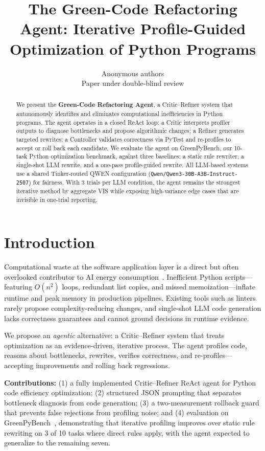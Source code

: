 \documentclass{article}
\title{\textbf{The Green-Code Refactoring Agent: Iterative Profile-Guided Optimization of Python Programs}}
\author{
Anonymous authors\\
Paper under double-blind review
}
\date{}
\begin{document}
\maketitle

\begin{abstract}
We present the \textbf{Green-Code Refactoring Agent}, a Critic--Refiner system that autonomously identifies and eliminates computational inefficiencies in Python programs. The agent operates in a closed ReAct loop: a Critic interprets profiler outputs to diagnose bottlenecks and propose algorithmic changes; a Refiner generates targeted rewrites; a Controller validates correctness via PyTest and re-profiles to accept or roll back each candidate. We evaluate the agent on GreenPyBench, our 10-task Python optimization benchmark, against three baselines: a static rule rewriter, a single-shot LLM rewrite, and a one-pass profile-guided rewrite. All LLM-based systems use a shared Tinker-routed QWEN configuration (\texttt{Qwen/Qwen3-30B-A3B-Instruct-2507}) for fairness. With 3 trials per LLM condition, the agent remains the strongest iterative method by aggregate VIS while exposing high-variance edge cases that are invisible in one-trial reporting.
\end{abstract}

\section{Introduction}

Computational waste at the software application layer is a direct but often overlooked contributor to AI energy consumption~\cite{strubell2019energy,schwartz2020green}. Inefficient Python scripts---featuring $O(n^2)$ loops, redundant list copies, and missed memoization---inflate runtime and peak memory in production pipelines. Existing tools such as linters rarely propose complexity-reducing changes, and single-shot LLM code generation lacks correctness guarantees and cannot ground decisions in runtime evidence.

We propose an \emph{agentic} alternative: a Critic--Refiner system that treats optimization as an evidence-driven, iterative process. The agent profiles code, reasons about bottlenecks, rewrites, verifies correctness, and re-profiles---accepting improvements and rolling back regressions.

\textbf{Contributions:} (1) a fully implemented Critic--Refiner ReAct agent for Python code efficiency optimization; (2) structured JSON prompting that separates bottleneck diagnosis from code generation; (3) a two-measurement rollback guard that prevents false rejections from profiling noise; and (4) evaluation on GreenPyBench~\cite{huamani2026greenpybench}, demonstrating that iterative profiling improves over static rule rewriting on 3 of 10 tasks where direct rules apply, with the agent expected to generalize to the remaining seven.
\end{document}

